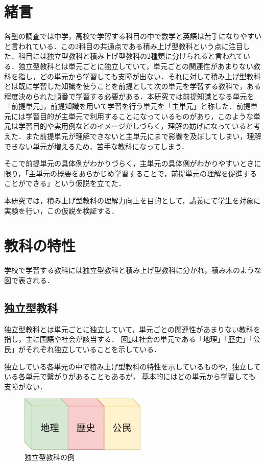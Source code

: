 \documentclass[a4j,12pt]{jsarticle}
\begin{document}

\semi

\tableofcontents

\newpage
\section{緒言}


各塾の調査では中学，高校で学習する科目の中で数学と英語は苦手になりやすいと言われている\cite{1}．この2科目の共通点である積み上げ型教科という点に注目した．科目には独立型教科と積み上げ型教科の2種類に分けられると言われている．独立型教科とは単元ごとに独立していて，単元ごとの関連性があまりない教科を指し，どの単元から学習しても支障が出ない．それに対して積み上げ型教科とは既に学習した知識を使うことを前提として次の単元を学習する教科で，ある程度決められた順番で学習する必要がある．本研究では前提知識となる単元を「前提単元」，前提知識を用いて学習を行う単元を「主単元」と称した．前提単元には学習目的が主単元で利用することになっているものがあり，このような単元は学習目的や実用例などのイメージがしづらく，理解の妨げになっていると考えた．また前提単元が理解できないと主単元にまで影響を及ぼしてしまい，理解できない単元が増えるため，苦手な教科になってしまう．

そこで前提単元の具体例がわかりづらく，主単元の具体例がわかりやすいときに限り，「主単元の概要をあらかじめ学習することで，前提単元の理解を促進することができる」という仮説を立てた．

本研究では，積み上げ型教科の理解力向上を目的として，講義にて学生を対象に実験を行い，この仮説を検証する．

\newpage
\section{教科の特性}
学校で学習する教科には独立型教科と積み上げ型教科に分かれ，積み木のような図で表される．\\


\subsection{独立型教科}
独立型教科とは単元ごとに独立していて，単元ごとの関連性があまりない教科を指し，主に国語や社会が該当する．
図\ref{fig:01}は社会の単元である「地理」「歴史」「公民」がそれぞれ独立していることを示している．

独立している各単元の中で積み上げ型教科の特性を示しているものや，独立している各単元で繋がりがあることもあるが，
基本的にはどの単元から学習しても支障がない．\\
\begin{figure}[H]
\centering
\includegraphics[width=6cm]{01.pdf}
\caption{独立型教科の例}
\label{fig:01}
\end{figure} 
\end{document}
